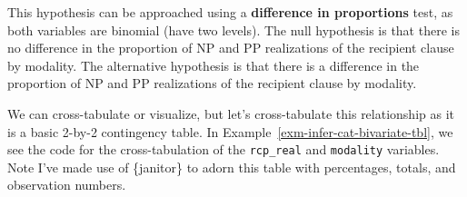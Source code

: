 \documentclass[
  letterpaper,
  krantz1]{latex/krantz-mod}
\theoremstyle{definition}
\theoremstyle{definition}
\theoremstyle{remark}
\begin{document}
This hypothesis can be approached using a \textbf{difference in
proportions} test, as both
variables are binomial (have two levels). The null hypothesis is that
there is no difference in the proportion of NP and PP realizations of
the recipient clause by modality. The alternative hypothesis is that
there is a difference in the proportion of NP and PP realizations of the
recipient clause by modality.

We can cross-tabulate or visualize, but let's cross-tabulate this
relationship as it is a basic 2-by-2 contingency
table. In
Example~\ref{exm-infer-cat-bivariate-tbl}, we see the code for the
cross-tabulation of the \texttt{rcp\_real} and \texttt{modality}
variables. Note I've made use of \{janitor\} to adorn this table with
percentages, totals, and observation numbers.
\end{document}
